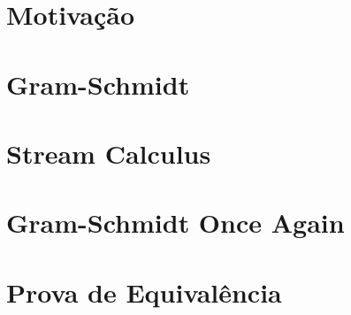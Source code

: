 \documentclass{beamer}
\begin{document}
  \frame{\titlepage}

  \section{Motivação}
  

  \section{Gram-Schmidt}
  

  \section{Stream Calculus}
  

  \section{Gram-Schmidt Once Again}
  

  \section{Prova de Equivalência}
  

  
\end{document}

